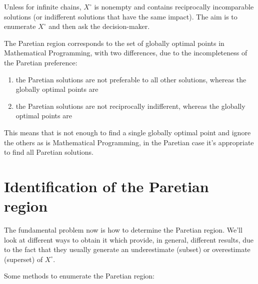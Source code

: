 Unless for infinite chains, $X^\circ$ is nonempty and contains reciprocally incomparable solutions (or indifferent solutions that have the same impact). The aim is to enumerate $X^\circ$ and then ask the decision-maker.

The Paretian region corresponds to the set of globally optimal points in Mathematical Programming, with two differences, due to the incompleteness of the Paretian preference: 
\begin{enumerate}
	\item the Paretian solutions are not preferable to all other solutions, whereas the globally optimal points are
	
	\item the Paretian solutions are not reciprocally indifferent, whereas the globally optimal points are
\end{enumerate}

This means that is not enough to find a single globally optimal point and ignore the others as is Mathematical Programming, in the Paretian case it's appropriate to find all Paretian solutions.

\section{Identification of the Paretian region}
\label{sec:identifyparetianregion}

The fundamental problem now is how to determine the Paretian region. We'll look at different ways to obtain it which provide, in general, different results, due to the fact that they usually generate an underestimate (subset) or overestimate (superset) of $X^\circ$.

Some methods to enumerate the Paretian region:



